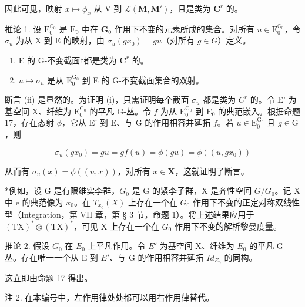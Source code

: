 因此可见，映射 \(x \mapsto \phi_x\) 从 V 到 \(\mathcal{L}(\mathbf{M}, \mathbf{M}')\)，且是类为 \(\mathbf{C}^r\) 的。

推论 1. 设 \(\mathrm{E}_0^{\mathbb{G}_0}\) 是 \(\mathrm{E}_0\) 中在 \(\mathbf{G}_0\) 作用下不变的元素所成的集合。对所有 \(u \in \mathrm{E}_0^{\mathbb{G}_0}\)，令 \(\sigma_u\) 为从 X 到 E 的映射，由 \(\sigma_u(gx_0) = gu\)（对所有 \(g \in G\)）定义。

\begin{enumerate}
\def\labelenumi{(\roman{enumi})}
\item
  E 的 G-不变截面†都是类为 \(\mathbf{C}^r\) 的。
\item
  \(u \mapsto \sigma_u\) 是从 \(\mathrm{E}_0^{\mathrm{G}_0}\) 到 E 的 G-不变截面集合的双射。
\end{enumerate}

断言 (ii) 是显然的。为证明 (i)，只需证明每个截面 \(\sigma_{u}\) 都是类为 \(C^r\) 的。令 E' 为基空间 X、纤维为 \(\mathrm{E}_0^{\mathrm{G}_0}\) 的平凡 G-丛。令 \(f\) 为从 \(\mathrm{E}_0^{\mathrm{G}_0}\) 到 \(\mathrm{E}_0\) 的典范嵌入。根据命题 17，存在态射 \(\phi\)，它从 E' 到 E、与 G 的作用相容并延拓 \(f\)。若 \(u \in \mathrm{E}_0^{\mathrm{G}_0}\) 且 \(g \in \mathrm{G}\)，则

\[
\sigma_ {u} (g x _ {0}) = g u = g f (u) = \phi (g u) = \phi ((u, g x _ {0}))
\]

从而有 \(\sigma_u(x) = \phi((u, x))\)，对所有 \(x \in \mathbf{X}\)，这就证明了断言。

*例如，设 G 是有限维实李群，\(G_{0}\) 是 G 的紧李子群，X 是齐性空间 \(G/G_{0}\)。记 X 中 e 的典范像为 \(x_{0}\)。在 \(T_{x_{0}}(X)\) 上存在一个在 \(G_{0}\) 作用下不变的正定对称双线性型（Integration，第 VII 章，第 § 3 节，命题 1）。将上述结果应用于 \((\mathrm{TX})^{*}\otimes(\mathrm{TX})^{*}\)，可见 X 上存在一个在 \(G_{0}\) 作用下不变的解析黎曼度量。

推论 2. 假设 \(G_{0}\) 在 \(E_{0}\) 上平凡作用。令 \(E'\) 为基空间 X、纤维为 \(E_{0}\) 的平凡 G-丛。存在唯一一个从 E 到 \(E'\)、与 G 的作用相容并延拓 \(Id_{E_{0}}\) 的同构。

这立即由命题 17 得出。

注 2. 在本编号中，左作用律处处都可以用右作用律替代。

